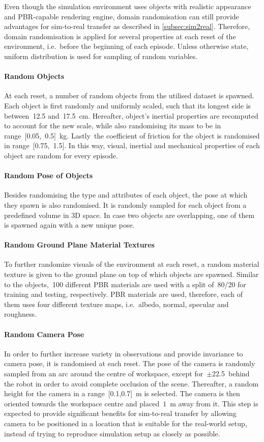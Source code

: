 Even though the simulation environment uses objects with realistic appearance and PBR-capable rendering engine, domain randomisation can still provide advantages for sim-to-real transfer as described in \autoref{subsec:sim2real}. Therefore, domain randomisation is applied for several properties at each reset of the environment, i.e.~before the beginning of each episode. Unless otherwise state, uniform distribution is used for sampling of random variables.

\paragraph{Random Objects} At each reset, a number of random objects from the utilised dataset is spawned. Each object is first randomly and uniformly scaled, such that its longest side is between~12.5 and~17.5~cm. Hereafter, object's inertial properties are recomputed to account for the new scale, while also randomising its mass to be in range~[0.05,~0.5]~kg. Lastly~the coefficient of friction for the object is randomised in range~[0.75,~1.5]. In this way, visual, inertial and mechanical properties of each object are random for every episode.

\paragraph{Random Pose of Objects} Besides randomising the type and attributes of each object, the pose at which they spawn is also randomised. It is randomly sampled for each object from a predefined volume in 3D space. In case two objects are overlapping, one of them is spawned again with a new unique pose.

\paragraph{Random Ground Plane Material Textures} To further randomize visuals of the environment at each reset, a random material texture is given to the ground plane on top of which objects are spawned. Similar to the objects,~100 different PBR materials are used with a split of~80/20 for training and testing, respectively. PBR materials are used, therefore, each of them uses four different texture maps, i.e.~albedo, normal, specular and roughness.

\paragraph{Random Camera Pose} In order to further increase variety in observations and provide invariance to camera pose, it is randomised at each reset. The pose of the camera is randomly sampled from an arc around the centre of workspace, except for~\(\pm\)22.5\textdegree\ behind the robot in order to avoid complete occlusion of the scene. Thereafter, a random height for the camera in a range~[0.1,0.7]~m is selected. The camera is then oriented towards the workspace centre and placed~\(1\)~m away from it. This step is expected to provide significant benefits for sim-to-real transfer by allowing camera to be positioned in a location that is suitable for the real-world setup, instead of trying to reproduce simulation setup as closely as possible.

